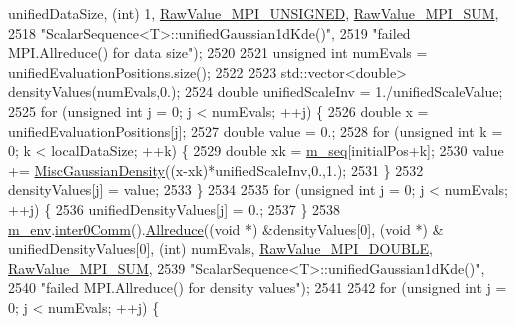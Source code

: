 \begin{DoxyCode}
      unifiedDataSize, (\textcolor{keywordtype}{int}) 1, \hyperlink{_mpi_comm_8h_a06cbfbc33436f6e0dc8a48ff3c49bdfc}{RawValue\_MPI\_UNSIGNED}, \hyperlink{_mpi_comm_8h_afbf78d291c032aa7f512bc566cee2bd1}{RawValue\_MPI\_SUM},
2518                                    \textcolor{stringliteral}{"ScalarSequence<T>::unifiedGaussian1dKde()"},
2519                                    \textcolor{stringliteral}{"failed MPI.Allreduce() for data size"});
2520 
2521       \textcolor{keywordtype}{unsigned} \textcolor{keywordtype}{int} numEvals = unifiedEvaluationPositions.size();
2522 
2523       std::vector<double> densityValues(numEvals,0.);
2524       \textcolor{keywordtype}{double} unifiedScaleInv = 1./unifiedScaleValue;
2525       \textcolor{keywordflow}{for} (\textcolor{keywordtype}{unsigned} \textcolor{keywordtype}{int} j = 0; j < numEvals; ++j) \{
2526         \textcolor{keywordtype}{double} x = unifiedEvaluationPositions[j];
2527         \textcolor{keywordtype}{double} value = 0.;
2528         \textcolor{keywordflow}{for} (\textcolor{keywordtype}{unsigned} \textcolor{keywordtype}{int} k = 0; k < localDataSize; ++k) \{
2529           \textcolor{keywordtype}{double} xk = \hyperlink{class_q_u_e_s_o_1_1_scalar_sequence_ae616036fd2e62fb69df167814545e893}{m\_seq}[initialPos+k];
2530           value += \hyperlink{namespace_q_u_e_s_o_a0f94e9b1e8f415c389f180d4a75c5591}{MiscGaussianDensity}((x-xk)*unifiedScaleInv,0.,1.);
2531         \}
2532         densityValues[j] = value;
2533       \}
2534 
2535       \textcolor{keywordflow}{for} (\textcolor{keywordtype}{unsigned} \textcolor{keywordtype}{int} j = 0; j < numEvals; ++j) \{
2536         unifiedDensityValues[j] = 0.;
2537       \}
2538       \hyperlink{class_q_u_e_s_o_1_1_scalar_sequence_a71618cd6351b29361b437af68447a4c8}{m\_env}.\hyperlink{class_q_u_e_s_o_1_1_base_environment_a689e4d140c74d495d97eb498714a4b82}{inter0Comm}().\hyperlink{class_q_u_e_s_o_1_1_mpi_comm_a72e137e60ef8060efb1ee5fc874fa4b8}{Allreduce}((\textcolor{keywordtype}{void} *) &densityValues[0], (\textcolor{keywordtype}{void} *) &
      unifiedDensityValues[0], (\textcolor{keywordtype}{int}) numEvals, \hyperlink{_mpi_comm_8h_ad0f503bd9fecfe4e570ca3d15aaf2518}{RawValue\_MPI\_DOUBLE}, 
      \hyperlink{_mpi_comm_8h_afbf78d291c032aa7f512bc566cee2bd1}{RawValue\_MPI\_SUM},
2539                                    \textcolor{stringliteral}{"ScalarSequence<T>::unifiedGaussian1dKde()"},
2540                                    \textcolor{stringliteral}{"failed MPI.Allreduce() for density values"});
2541 
2542       \textcolor{keywordflow}{for} (\textcolor{keywordtype}{unsigned} \textcolor{keywordtype}{int} j = 0; j < numEvals; ++j) \{

\end{DoxyCode}
